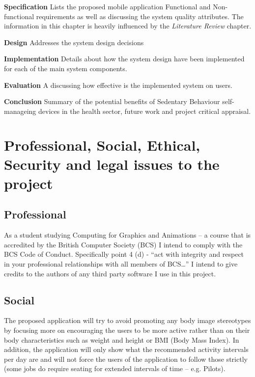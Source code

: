     
    \textbf{Specification} Lists the proposed mobile application Functional and Non-functional requirements as well as discussing the system quality attributes. The information in this chapter is heavily influenced by the \textit{Literature Review} chapter.\newline
    
    
    \textbf{Design} Addresses the system design decisions\newline
    
    
    \textbf{Implementation} Details about how the system design have been implemented for each of the main system components.\newline
    
    
    \textbf{Evaluation} A discussing how effective is the implemented system on users.\newline
    
    
    \textbf{Conclusion} Summary of the potential benefits of Sedentary Behaviour self-manageing devices in the health sector, future work and project critical appraisal.\newline
    
    
    \section{Professional, Social, Ethical, Security and legal issues to the project}
    
    \subsection{Professional}
    As a student studying Computing for Graphics and Animations – a course that is accredited by the British Computer Society (BCS) I intend to comply with the BCS Code of Conduct. Specifically point 4 (d) \citep{bcs_2017} - “act with integrity and respect in your professional relationships with all members of BCS…” I intend to give credits to the authors of any third party software I use in this project.

    \subsection{Social}
    The proposed application will try to avoid promoting any body image stereotypes by focusing more on encouraging the users to be more active rather than on their body characteristics such as weight and height or BMI (Body Mass Index). In addition, the application will only show what the recommended activity intervals per day are and will not force the users of the application to follow those strictly (some jobs do require seating for extended intervals of time – e.g. Pilots).
    
